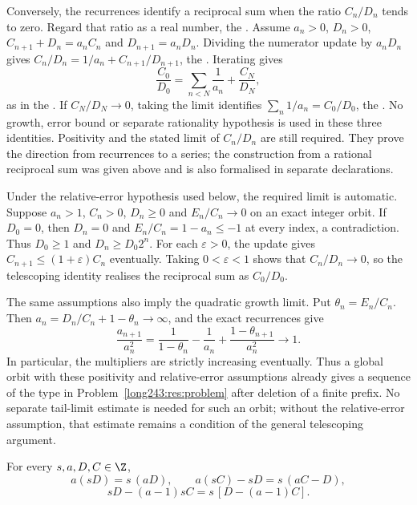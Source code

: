 Conversely, the recurrences identify a reciprocal sum when the ratio
$C_n/D_n$ tends to zero. Regard that ratio as a real number, the
.
Assume $a_n>0$, $D_n>0$, $C_{n+1}+D_n=a_nC_n$ and
$D_{n+1}=a_nD_n$. Dividing the numerator update by $a_nD_n$ gives
$C_n/D_n=1/a_n+C_{n+1}/D_{n+1}$, the
. Iterating gives
\[
 \frac{C_0}{D_0}=\sum_{n<N}\frac1{a_n}+\frac{C_N}{D_N},
\]
as in the . If $C_N/D_N\to0$, taking the limit identifies
$\sum_n1/a_n=C_0/D_0$, the
.  No growth, error bound or separate rationality hypothesis is used in
these three identities. Positivity and the stated limit of $C_n/D_n$
are still required. They prove the direction from recurrences to a series;
the construction from a rational reciprocal sum was given above and is
also formalised in separate declarations.

Under the relative-error hypothesis used below, the required limit is
automatic. Suppose $a_n>1$, $C_n>0$, $D_n\ge0$ and $E_n/C_n\to0$ on an
exact integer orbit. If $D_0=0$, then $D_n=0$ and
$E_n/C_n=1-a_n\le-1$ at every index, a contradiction. Thus $D_0\ge1$ and
$D_n\ge D_0 2^n$. For each $\varepsilon>0$, the update gives
$C_{n+1}\le(1+\varepsilon)C_n$ eventually. Taking $0<\varepsilon<1$
shows that $C_n/D_n\to0$, so the telescoping identity realises the
reciprocal sum as $C_0/D_0$.

The same assumptions also imply the quadratic growth limit. Put
$\theta_n=E_n/C_n$. Then $a_n=D_n/C_n+1-\theta_n\to\infty$, and the
exact recurrences give
\[
 \frac{a_{n+1}}{a_n^2}
 =\frac1{1-\theta_n}-\frac1{a_n}
   +\frac{1-\theta_{n+1}}{a_n^2}\longrightarrow1.
\]
In particular, the multipliers are strictly increasing eventually.
Thus a global orbit with these positivity and relative-error assumptions
already gives a sequence of the type in Problem~\ref{long243:res:problem}
after deletion of a finite prefix. No separate tail-limit estimate is
needed for such an orbit; without the relative-error assumption, that
estimate remains a condition of the general telescoping argument.

\begin{proposition}\label{long243:res:scale}
For every $s,a,D,C\in\Z$,
\[
 a(sD)=s\,(aD),\qquad
 a(sC)-sD=s\,(aC-D),
\]
\[
 sD-(a-1)sC=s\,[D-(a-1)C].
\]
\end{proposition}


